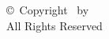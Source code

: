 \thispagestyle{empty}

\vspace*{\fill}

\begin{center}
\copyright\ Copyright \dissertationyear\ by \authorname\\
All Rights Reserved
\end{center}

\vspace*{\fill}

\newpage